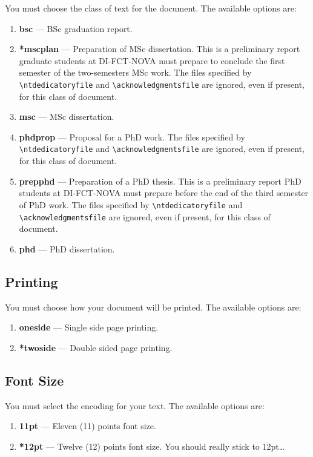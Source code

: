 You must choose the class of text for the document. The available options are:

\begin{enumerate}
  \item \textbf{bsc} --- BSc graduation report.
  \item \textbf{*mscplan} --- Preparation of MSc dissertation. This is a preliminary report graduate students at DI-FCT-NOVA must prepare to conclude the first semester of the two-semesters MSc work. The files specified by \verb!\ntdedicatoryfile! and \verb!\acknowledgmentsfile! are ignored, even if present, for this class of document.
  \item \textbf{msc} --- MSc dissertation.
  \item \textbf{phdprop} ---  Proposal for a PhD work. The files specified by \verb!\ntdedicatoryfile! and \verb!\acknowledgmentsfile! are ignored, even if present, for this class of document.
  \item \textbf{prepphd} ---  Preparation of a PhD thesis. This is a preliminary report PhD students at DI-FCT-NOVA must prepare before the end of the third semester of PhD work. The files specified by \verb!\ntdedicatoryfile! and \verb!\acknowledgmentsfile! are ignored, even if present, for this class of document.
  \item \textbf{phd} --- PhD dissertation.
\end{enumerate}

\subsection{Printing}
\label{sub:printing}

You must choose how your document will be printed. The available options are:
\begin{enumerate}
  \item \textbf{oneside} --- Single side page printing.
  \item \textbf{*twoside} --- Double sided page printing.
\end{enumerate}

\subsection{Font Size}
\label{ssec:font_size}

You must select the encoding for your text. The available options are:
\begin{enumerate}
  \item \textbf{11pt} --- Eleven (11) points font size.
  \item \textbf{*12pt} --- Twelve (12) points font size. You should really stick to 12pt\ldots
\end{enumerate}

